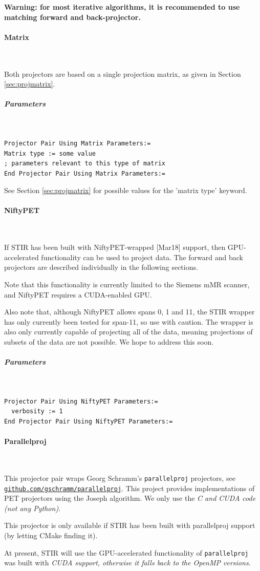 \documentclass{article}
\def\url#1#2{\mbox{\href{#1}{\tt #2}}}
\newcommand{\subsubsubsection}[1]{\paragraph{#1}\mbox{} \\}
\newcommand{\subsubsubsubsection}[1]{\subparagraph{#1} \mbox{} \\}
\begin{document}
{{\textbf{Warning: for most iterative algorithms, it is recommended 
to use matching forward and back-projector.}

{ \subsubsubsection{Matrix}
}
\label{sec:projectorpairusingmatrix}
Both projectors are based on a single projection matrix, as given 
in Section \ref{sec:projmatrix}.

{ \subsubsubsubsection{Parameters}
}
\begin{verbatim}
Projector Pair Using Matrix Parameters:=
Matrix type := some value
; parameters relevant to this type of matrix
End Projector Pair Using Matrix Parameters:=
\end{verbatim}

See Section \ref{sec:projmatrix} for possible values for the 'matrix type' keyword.

{ \subsubsubsection{NiftyPET}
}
\label{sec:projectorpairusingNiftyPET}
If STIR has been built with NiftyPET-wrapped [Mar18] support, then GPU-accelerated functionality can be used to project data. The forward and back projectors are described individually in the following sections.

Note that this functionality is currently limited to the Siemens mMR scanner, and NiftyPET requires a CUDA-enabled GPU.

Also note that, although NiftyPET allows spans 0, 1 and 11, the STIR wrapper has only currently been tested for span-11, so use with caution. The wrapper is also only currently capable of projecting all of the data, meaning projections of subsets of the data are not possible. We hope to address this soon.

{ \subsubsubsubsection{Parameters}
}
\begin{verbatim}
Projector Pair Using NiftyPET Parameters:=
  verbosity := 1
End Projector Pair Using NiftyPET Parameters:=
\end{verbatim}

{ \subsubsubsection{Parallelproj}
\label{sec:projectorpairusingparallelproj}
}
This projector pair wraps Georg Schramm's \texttt{parallelproj} projectors, see
\url{https://github.com/gschramm/parallelproj}{github.com/gschramm/parallelproj}. This project provides implementations
of PET projectors using the Joseph algorithm. We only use the \em{C} and \em{CUDA} code (not any \textit{Python}).

This projector is only available if STIR has been built with parallelproj support (by letting CMake finding it).

At present, STIR will use the GPU-accelerated functionality of \texttt{parallelproj} was
built with \em{CUDA} support, otherwise it falls back to the \em{OpenMP} versions.


}}
\end{document}
